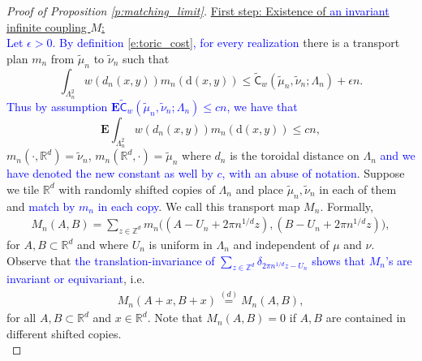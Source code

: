 \documentclass[12pt]{article}
\newtheorem{lemma}[theorem]{Lemma}
\newcommand{\C}{ {\mathsf C}}
\newcommand{\R}{\mathbb{R}}
\newcommand{\Z}{\mathbb{Z}}
\newcommand{\equlaw}{\stackrel{(d)}{=}}
\newcommand{\1}{\mathbf{1}}
\newcommand{\md}{\mathrm{d}}
\newcommand{\tmu}{\tilde{\mu}}
\newcommand{\E}{\mathbf  E}
\newcommand{\RL}[1]{\textcolor{blue}{#1}}
\newcommand{\dy}[1]{\textcolor{blue}{#1}}
\newcommand{\RL}[1]{#1}%
\newcommand{\dy}[1]{#1}%
\begin{document}
{{{{{\begin{proof}[Proof of Proposition \ref{p:matching_limit}]
 \underline { First step: Existence of \dy{  an invariant} infinite coupling $ M$:}  \\


\dy{Let $\epsilon > 0$. By definition \eqref{e:toric_cost}, for every realization} {there is a transport plan $ m_{n}$ from $ \tilde \mu_{n}$ to $ \tilde \nu _{n}$ such that}
%
$$\int _{\Lambda _{n}^{2}} w(d_{n}(x,y)) m_n(\md (x,y)) \leq \widetilde {\C}_{w}(\tmu _{n}, \tilde \nu _{n};\Lambda_n) + \epsilon n.$$
%
\dy{Thus by assumption $\E \widetilde {\C}_{w}(\tmu _{n}, \tilde \nu _{n};\Lambda_n) \leq cn$, we have that} 
%
\begin{equation}
\label{e:dnmn1}
\E \int _{\Lambda _{n}^{2}} w(d_{n}(x,y)) m_n(\md (x,y)) \leqslant cn,
\end{equation}
%
$m_n(\cdot,\R^d) = \tilde \nu _n$, $m_n(\R^d,\cdot) =  \tilde \mu_n$ where $d_n$ is the toroidal distance  {on $\Lambda_n$} \dy{and we have denoted the new constant as well by $c$, with an abuse of notation}. Suppose we tile $\R^d$ with randomly shifted copies of $\Lambda_n$ and place $ \tilde\mu_n,\tilde \nu _{n}$ in each of them
and \dy{match by $ m_{n}$ in each copy}. We call this transport map $M_n$.
Formally,
%
\begin{align}
\label{eq:stationarized}
M_n(A , B) = \sum_{z \in \Z^d} m_n\big((A-U_{n} + {2\pi}n^{1/d}z) , (B-U_{n} + {2\pi}n^{1/d}z) \big),\end{align}
%
for $A,B \subset \R^d$ and where $U_{n}$ is uniform in $\Lambda_n$ and independent of $\mu$ and $ \nu $. Observe that \dy{the translation-invariance of $\sum_{z \in \Z^d}\delta_{ {2\pi}n^{1/d}z - U_{n}}$ shows that $M_n$'s are  invariant or equivariant}, i.e.
%
\begin{align}
\label{eq:trans-inv-Mn}  {M_{n}(A + x,B + x)\equlaw M_{n}(A,B)},
\end{align}
%
for all $ A,B \subset \R^d$ and $x \in \R^d$. Note that $ M_{n}(A,B)= 0$ if $ A,B$ are contained in different shifted copies. \\


\end{proof}}}}}}
\end{document}

